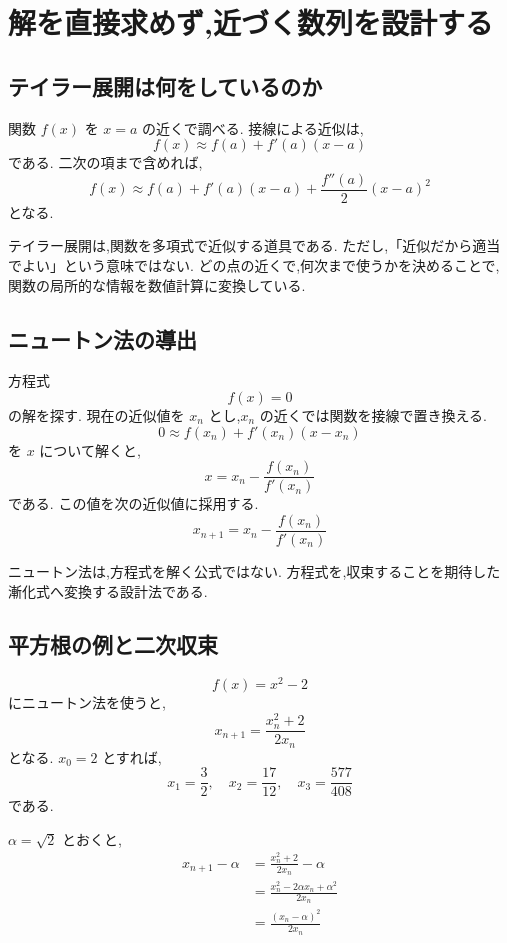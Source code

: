 
\section{解を直接求めず,近づく数列を設計する}

\subsection{テイラー展開は何をしているのか}

関数 $f(x)$ を $x=a$ の近くで調べる.
接線による近似は,
\[
  f(x)\approx f(a)+f'(a)(x-a)
\]
である.
二次の項まで含めれば,
\[
  f(x)
  \approx f(a)+f'(a)(x-a)
  +\frac{f''(a)}{2}(x-a)^2
\]
となる.

テイラー展開は,関数を多項式で近似する道具である.
ただし,「近似だから適当でよい」という意味ではない.
どの点の近くで,何次まで使うかを決めることで,関数の局所的な情報を数値計算に変換している.

\subsection{ニュートン法の導出}

方程式
\[
  f(x)=0
\]
の解を探す.
現在の近似値を $x_n$ とし,$x_n$ の近くでは関数を接線で置き換える.
\[
  0\approx f(x_n)+f'(x_n)(x-x_n)
\]
を $x$ について解くと,
\[
  x=x_n-\frac{f(x_n)}{f'(x_n)}
\]
である.
この値を次の近似値に採用する.
\[
  x_{n+1}=x_n-\frac{f(x_n)}{f'(x_n)}
\]

ニュートン法は,方程式を解く公式ではない.
方程式を,収束することを期待した漸化式へ変換する設計法である.

\subsection{平方根の例と二次収束}

\[
  f(x)=x^2-2
\]
にニュートン法を使うと,
\[
  x_{n+1}=\frac{x_n^2+2}{2x_n}
\]
となる.
$x_0=2$ とすれば,
\[
  x_1=\frac32,\quad
  x_2=\frac{17}{12},\quad
  x_3=\frac{577}{408}
\]
である.

$\alpha=\sqrt2$ とおくと,
\[
  \begin{aligned}
    x_{n+1}-\alpha
     & =\frac{x_n^2+2}{2x_n}-\alpha             \\
     & =\frac{x_n^2-2\alpha x_n+\alpha^2}{2x_n} \\
     & =\frac{(x_n-\alpha)^2}{2x_n}
  \end{aligned}
\]

